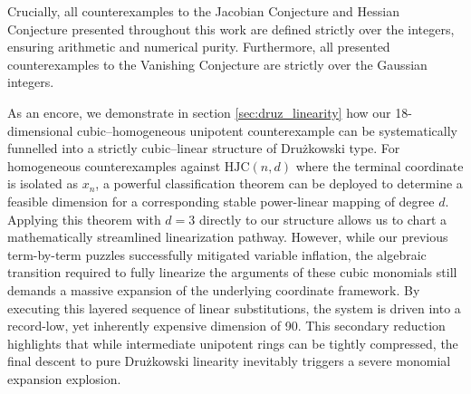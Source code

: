 \documentclass[11pt,a4paper]{article}
\begin{document}
Crucially, all counterexamples to the Jacobian Conjecture and Hessian Conjecture presented throughout this work are defined strictly over the integers, ensuring arithmetic and numerical purity. Furthermore, all presented counterexamples to the Vanishing Conjecture are strictly over the Gaussian integers.

As an encore, we demonstrate in section \ref{sec:druz_linearity} how our 18-dimensional cubic--homogeneous unipotent counterexample can be systematically funnelled into a strictly cubic--linear structure of Drużkowski type. For homogeneous counterexamples against $\mathrm{HJC}(n,d)$ where the terminal coordinate is isolated as $x_n$, a powerful classification theorem can be deployed to determine a feasible dimension for a corresponding stable power-linear mapping of degree $d$. Applying this theorem with $d=3$ directly to our structure allows us to chart a mathematically streamlined linearization pathway. However, while our previous term-by-term puzzles successfully mitigated variable inflation, the algebraic transition required to fully linearize the arguments of these cubic monomials still demands a massive expansion of the underlying coordinate framework. By executing this layered sequence of linear substitutions, the system is driven into a record-low, yet inherently expensive dimension of 90. This secondary reduction highlights that while intermediate unipotent rings can be tightly compressed, the final descent to pure Drużkowski linearity inevitably triggers a severe monomial expansion explosion.
\end{document}
